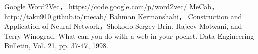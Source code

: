 \documentclass{../style/sig-alternate}
\begin{document}
\begin{thebibliography}{99}

 Google Word2Vec， https://code.google.com/p/word2vec/
 MeCab， http://taku910.github.io/mecab/
 Bahman Kermanshahi， Construction and Application of Neural Network，Shokodo
 Sergey Brin, Rajeev Motwani, and Terry Winograd. What can you do with a
web in your pocket. Data Engineering Bulletin, Vol. 21, pp. 37-47, 1998.

\end{thebibliography}
\end{document}
